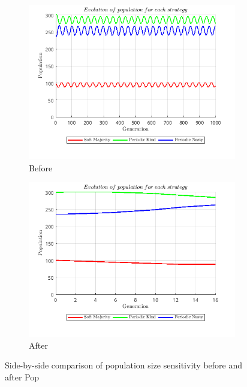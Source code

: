 \documentclass[12pt]{report}
\begin{document}
\begin{figure}[H]
    \centering
    \begin{subfigure}[t]{0.45\textwidth}
        \centering
        \includegraphics[width=\textwidth]{population_size_sensitivity_before_pop.png}
        \caption{Before}
    \end{subfigure}
    \hfill
    \begin{subfigure}[t]{0.45\textwidth}
        \centering
        \includegraphics[width=\textwidth]{population_size_sensitivity_after_pop.png}
        \caption{After}
    \end{subfigure}
    \caption{Side-by-side comparison of population size sensitivity before and after Pop}
\end{figure}
\end{document}
